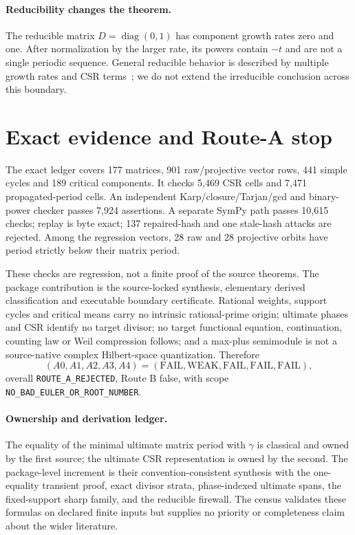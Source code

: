\documentclass[9pt]{extarticle}
\begin{document}
\paragraph{Reducibility changes the theorem.}
The reducible matrix $D=\operatorname{diag}(0,1)$ has component growth rates
zero and one.  After normalization by the larger rate, its powers contain
$-t$ and are not a single periodic sequence.  General reducible behavior is
described by multiple growth rates and CSR terms~\cite{SS12}; we do not extend
the irreducible conclusion across this boundary.

\section{Exact evidence and Route-A stop}
The exact ledger covers 177 matrices, 901 raw/projective vector rows, 441
simple cycles and 189 critical components.  It checks 5,469 CSR cells and
7,471 propagated-period cells.  An independent Karp/closure/Tarjan/gcd and
binary-power checker passes 7,924 assertions.  A separate SymPy path passes
10,615 checks; replay is byte exact; 137 repaired-hash and one stale-hash
attacks are rejected.  Among the regression vectors, 28 raw and 28 projective
orbits have period strictly below their matrix period.

These checks are regression, not a finite proof of the source theorems.  The
package contribution is the source-locked synthesis, elementary derived
classification and executable boundary certificate.  Rational weights,
support cycles and critical means carry no intrinsic rational-prime origin;
ultimate phases and CSR identify no target divisor; no target functional
equation, continuation, counting law or Weil compression follows; and a
max-plus semimodule is not a source-native complex Hilbert-space quantization.
Therefore
\[
 (A0,A1,A2,A3,A4)=(\mathrm{FAIL},\mathrm{WEAK},\mathrm{FAIL},
 \mathrm{FAIL},\mathrm{FAIL}),
\]
overall \texttt{ROUTE\_A\_REJECTED}, Route B false, with scope
\texttt{NO\_BAD\_EULER\_OR\_ROOT\_NUMBER}.

\paragraph{Ownership and derivation ledger.}
The equality of the minimal ultimate matrix period with $\gamma$ is classical
and owned by the first source; the ultimate CSR representation is owned by the
second.  The package-level increment is their convention-consistent synthesis
with the one-equality transient proof, exact divisor strata, phase-indexed
ultimate spans, the fixed-support sharp family, and the reducible firewall.
The census validates these formulas on declared finite inputs but supplies no
priority or completeness claim about the wider literature.
\end{document}
